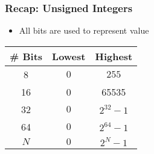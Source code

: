 \begin{frame}
  \frametitle{Recap: Unsigned Integers}
  \begin{itemize}
    \item All bits are used to represent value
  \end{itemize}
  \begin{center}
  \end{center}
  \begin{center}
    \begin{tabular}{ccc}
      \toprule
      \textbf{\# Bits} & \textbf{Lowest} & \textbf{Highest} \\
      \midrule
      8 & $0$ & $255$ \\
      16 & \num{0} & \num{65535} \\
      32 & $0$ & $2^{32}-1$ \\
      64 & $0$ & $2^{64}-1$ \\
      $N$ & $0$ & $2^{N}-1$ \\
      \bottomrule
    \end{tabular}
  \end{center}
\end{frame}
